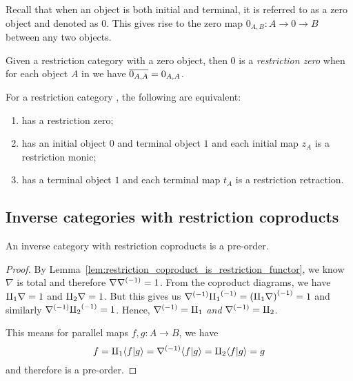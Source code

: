 Recall that when an object is both initial and terminal, it is referred to as a zero object and
denoted as $0$. This gives rise to the zero map $0_{A,B}: A \to 0 \to B$ between any two objects.

\begin{definition}\label{def:restriction_zero}
  Given a restriction category \X with a zero object, then $0$ is a \emph{restriction zero} when
  for each object $A$ in \X we have $\overline{0_{A,A}} = 0_{A,A}$.
\end{definition}

\begin{lemma}\label{lem:restriction_zero_equivalences}
  For a restriction category \X, the following are equivalent:
  \begin{enumerate}[{(}i{)}]
    \item \X has a restriction zero;
    \item \X has an initial object $0$ and terminal object $1$ and each initial map $z_A$ is a
      restriction monic;
    \item \X has a terminal object $1$ and each terminal map $t_A$ is a restriction retraction.
  \end{enumerate}
\end{lemma}




\subsection{Inverse categories with restriction coproducts} %
\label{sub:inverse_categories_with_restriction_coproducts}


\begin{proposition}\label{prop:inverse_category_with_coproducts_is_pre-order}
  An inverse category \X with restriction coproducts is a pre-order.
\end{proposition}
\begin{proof}
  By Lemma~\ref{lem:restriction_coproduct_is_restriction_functor}, we know $\nabla$ is total and
  therefore $\nabla{\nabla}^{(-1)} = 1$. From the coproduct diagrams, we have $\amalg_{1}\nabla =1$ and
  $\amalg_{2}\nabla = 1$. But this gives us ${\nabla}^{(-1)}{\amalg_{1}}^{(-1)} = {(\amalg_{1}\nabla)}^{(-1)} = 1$ and
  similarly ${\nabla}^{(-1)}{\amalg_{2}}^{(-1)} =1$. Hence, ${\nabla}^{(-1)} = \amalg_{1}$ \emph{and} ${\nabla}^{(-1)} =
  \amalg_{2}$.

  This means for parallel maps $f,g:A \to B$, we have
  \[
    f = \amalg_{1} \langle f|g\rangle = {\nabla}^{(-1)} \langle f|g\rangle = \amalg_{2}\langle f|g\rangle = g
  \]
  and therefore \X is a pre-order.
\end{proof}

